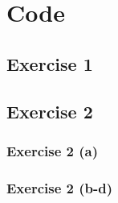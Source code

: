 \documentclass{article}
\begin{document}
\appendix
\section{Code}
\subsection{Exercise 1}

\subsection{Exercise 2}
\subsubsection{Exercise 2 (a)}

\subsubsection{Exercise 2 (b-d)}

\end{document}
